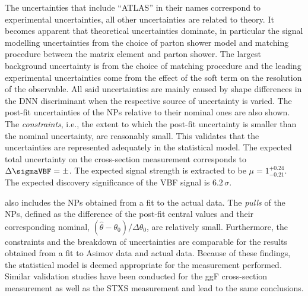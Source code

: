 The uncertainties that include ``ATLAS'' in their names correspond to experimental uncertainties, all other uncertainties are related to theory. 
It becomes apparent that theoretical uncertainties dominate, in particular the signal modelling uncertainties from the choice of parton shower model and matching procedure between the matrix element and parton shower. 
The largest background uncertainty is from the choice of \ttbar matching procedure and the leading experimental uncertainties come from the effect of the \MET soft term on the resolution of the \MET observable.  
All said uncertainties are mainly caused by shape differences in the DNN discriminant when the respective source of uncertainty is varied.
The post-fit uncertainties of the NPs relative to their nominal ones are also shown. The \emph{constraints}, i.e., the extent to which the post-fit uncertainty is smaller than the nominal uncertainty, are reasonably small.
This validates that the uncertainties are represented adequately in the statistical model. 
The expected total uncertainty on the cross-section measurement corresponds to $\Delta \sigmaVBF = \pm  $. 
The expected signal strength is extracted to be $\mu = 1^{+0.24}_{-0.21}$.
The expected discovery significance of the VBF signal is $6.2\,\sigma$. 

 also includes the NPs obtained from a fit to the actual data. 
The \emph{pulls} of the NPs, defined as the difference of the post-fit central values and their corresponding nominal, $(\hat{\theta} - \theta_0 ) / \Delta \theta_0$, are relatively small. 
Furthermore, the constraints and the breakdown of uncertainties are comparable for the results obtained from a fit to Asimov data and actual data. 
Because of these findings, the statistical model is deemed appropriate for the measurement performed. 
Similar validation studies have been conducted for the ggF cross-section measurement as well as the STXS measurement and lead to the same conclusions. 


